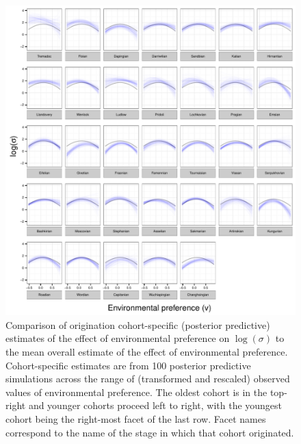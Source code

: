 \documentclass{article}
\begin{document}
\begin{figure}[ht]
  \centering
  \includegraphics[width = \textwidth,height = \textheight,keepaspectratio=true]{figure/env_cohort}
  \caption{Comparison of origination cohort-specific (posterior predictive) estimates of the effect of environmental preference on \(\log(\sigma)\) to the mean overall estimate of the effect of environmental preference. Cohort-specific estimates are from 100 posterior predictive simulations across the range of (transformed and rescaled) observed values of environmental preference. The oldest cohort is in the top-right and younger cohorts proceed left to right, with the youngest cohort being the right-most facet of the last row. Facet names correspond to the name of the stage in which that cohort originated.}
  \label{fig:env_cohort}
\end{figure}
\end{document}
